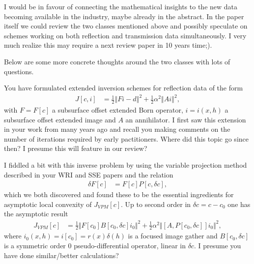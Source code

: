 \documentclass[10pt]{article}
\begin{document}
I would be in favour of connecting the mathematical insights to the new data becoming available in the industry, maybe already in the abstract. In the paper itself we could review the two classes mentioned above and possibly speculate on schemes working on both reflection and transmission data simultaneously. I very much realize this may require a next review paper in 10 years time;).

Below are some more concrete thoughts around the two classes with lots of questions.

You have formulated extended inversion schemes for reflection data of the form
\begin{align}\label{ExtendedReflectionInversion}
  J[c,i] & = \frac{1}{2}\left\Vert Fi-d \right\Vert^2 + \frac{1}{2}\alpha^2\left\Vert Ai\right\Vert^2,
\end{align}
with $F=F[c]$ a subsurface offset extended Born operator, $i=i(x,h)$ a subsurface offset extended image and $A$ an annihilator. I first saw this extension in your work from many years ago and recall you making comments on the number of iterations required by early pactitioners. Where did this topic go since then? I presume this will feature in our review?

I fiddled a bit with this inverse problem by using the variable projection method described in your WRI and SSE papers and the relation
\begin{align}\label{PerturbationExtendedBornOperator}
  \delta F[c] & = F[c]P[c,\delta c],
\end{align}
which we both discovered and found these to be the essential ingredients for asymptotic local convexity of $J_{VPM}[c]$. Up to second order in $\delta c=c-c_0$ one has the asymptotic result
\begin{align}\label{ExtendedReflectionInversion_AsymptoticConvexity}
  J_{VPM}[c] & = \frac{1}{2}\Vert F[c_0]B[c_0,\delta c]i_0\Vert^2+
  \frac{1}{2}\alpha^2\Vert[A,P[c_0,\delta c]]i_0\Vert^2,
\end{align}
 where $i_0(x,h)=i[c_0]=r(x)\delta(h)$ is a focused image gather and $B[c_0,\delta c]$ is a symmetric order $0$ pseudo-differential operator, linear in $\delta c$. I presume you have done similar/better calculations?
 
\end{document}
